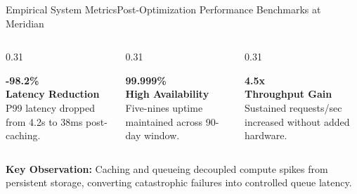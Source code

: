 \documentclass[aspectratio=169, 10pt]{beamer}
\begin{document}
\begin{frame}{Empirical System Metrics}{Post-Optimization Performance Benchmarks at Meridian}
  \vspace*{-0.3cm}
  \begin{columns}[T]
    \begin{column}{0.31\textwidth}
      \begin{tcolorbox}[nordiccard]
        \begin{center}
          {\color{NordicBlue}\Large\bfseries -98.2\%}\\[0.05cm]
          {\color{NordicDark}\bfseries\small Latency Reduction}\\[0.1cm]
          {\color{NordicGray}\tiny P99 latency dropped from 4.2s to 38ms post-caching.}
        \end{center}
      \end{tcolorbox}
    \end{column}

    \begin{column}{0.31\textwidth}
      \begin{tcolorbox}[nordiccard]
        \begin{center}
          {\color{NordicTeal}\Large\bfseries 99.999\%}\\[0.05cm]
          {\color{NordicDark}\bfseries\small High Availability}\\[0.1cm]
          {\color{NordicGray}\tiny Five-nines uptime maintained across 90-day window.}
        \end{center}
      \end{tcolorbox}
    \end{column}

    \begin{column}{0.31\textwidth}
      \begin{tcolorbox}[nordiccard]
        \begin{center}
          {\color{NordicNavy}\Large\bfseries 4.5x}\\[0.05cm]
          {\color{NordicDark}\bfseries\small Throughput Gain}\\[0.1cm]
          {\color{NordicGray}\tiny Sustained requests/sec increased without added hardware.}
        \end{center}
      \end{tcolorbox}
    \end{column}
  \end{columns}

  \vspace*{0.15cm}
  \begin{tcolorbox}[nordicaccent]
    {\color{NordicDark}\bfseries Key Observation:} Caching and queueing decoupled compute spikes from persistent storage, converting catastrophic failures into controlled queue latency.
  \end{tcolorbox}
\end{frame}
\end{document}
